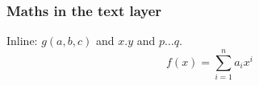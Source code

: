 \documentclass{ltx-talk}
\begin{document}
\begin{frame}
\frametitle{Maths in the text layer}
Inline: $g(a, b, c)$ and $x.y$ and $p \ldots q$.
\[ f(x) = \sum_{i=1}^{n} a_i x^i \]
\end{frame}
\end{document}
